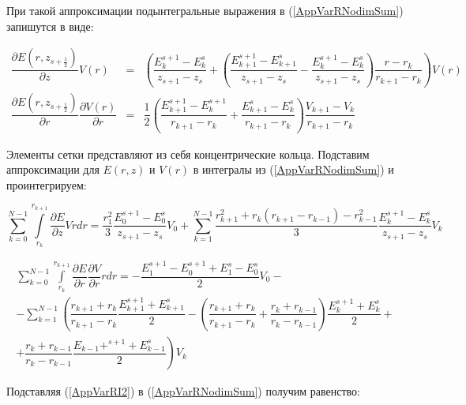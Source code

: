 При такой аппроксимации подынтегральные выражения в (\ref{AppVarRNodimSum}) запишутся в виде:

\begin{equation}
	\begin{array}{lll}
		\dfrac{\partial E(r, z_{s+\frac{1}{2}})}{\partial z} V(r) & = & \left(
		\dfrac{E_k^{s+1}-E_k^s}{z_{s+1}-z_s} + \left( \dfrac{E_{k+1}^{s+1}-E_{k+1}^s}{z_{s+1}-z_s} -
		\dfrac{E_k^{s+1}-E_k^s}{z_{s+1}-z_s} \right) \dfrac{r-r_k}{r_{k+1}-r_k} \right) V(r) \\[1em]

		\dfrac{\partial E(r, z_{s+\frac{1}{2}})}{\partial r} \dfrac{\partial V(r)}{\partial r} & = & \dfrac{1}{2} \left(
		\dfrac{E_{k+1}^{s+1}-E_k^{s+1}}{r_{k+1}-r_k} + \dfrac{E_{k+1}^s-E_k^s}{r_{k+1}-r_k} \right)
		\dfrac{V_{k+1}-V_k}{r_{k+1}-r_k}
	\end{array}
\end{equation}

Элементы сетки представляют из себя концентрические кольца. Подставим аппроксимации для $E(r, z)$ и $V(r)$ в интегралы из (\ref{AppVarRNodimSum}) и проинтегрируем:

\begin{equation}\label{AppVarRI1}
\sum\limits_{k=0}^{N-1} \int\limits_{r_k}^{r_{k+1}} \dfrac{\partial E}{\partial z} V r dr =
\dfrac{r_1^2}{3}\dfrac{E_0^{s+1}-E_0^s}{z_{s+1}-z_s} V_0 +
\sum\limits_{k=1}^{N-1} \dfrac{r_{k+1}^2 + r_k(r_{k+1}-r_{k-1})-r_{k-1}^2}{3}\dfrac{E_k^{s+1}-E_k^s}{z_{s+1}-z_s} V_k
\end{equation}

\begin{equation}\label{AppVarRI2}
	\begin{array}{l}
		\sum\limits_{k=0}^{N-1} \int\limits_{r_k}^{r_{k+1}}\dfrac{\partial E}{\partial r}\dfrac{\partial V}{\partial r} r dr =
		-\dfrac{E_1^{s+1}-E_0^{s+1}+E_1^s-E_0^s}{2} V_0 -\\[1em]
		-\sum\limits_{k=1}^{N-1}\left( \dfrac{r_{k+1}+r_k}{r_{k+1}-r_k}\dfrac{E_{k+1}^{s+1}+E_{k+1}^s}{2} -
		\left(\dfrac{r_{k+1}+r_k}{r_{k+1}-r_k} + \dfrac{r_k+r_{k-1}}{r_k-r_{k-1}} \right)\dfrac{E_k^{s+1}+E_k^s}{2} + \right. \\[1em]
		\left. + \dfrac{r_k+r_{k-1}}{r_k-r_{k-1}}\dfrac{E_{k-1}+^{s+1}+E_{k-1}^s}{2}\right) V_k
	\end{array}
\end{equation}

Подставляя (\ref{AppVarRI2}) в (\ref{AppVarRNodimSum}) получим равенство:

